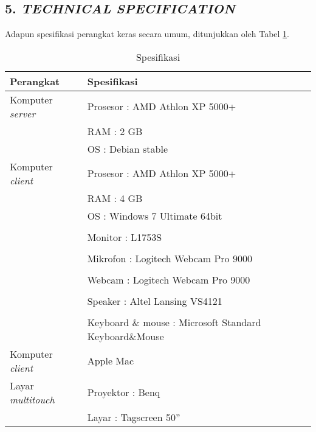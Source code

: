 \subsection*{\textcolor{subsectioncolor}{\textsf{5. \textit{TECHNICAL SPECIFICATION}}}}

Adapun spesifikasi perangkat keras secara umum, ditunjukkan oleh Tabel \ref{spesifikasi}.
\begin{table}
	\centering
		\begin{tabular}{|p{4cm}|p{11cm}|}
			\hline
				Perangkat & Spesifikasi\\
			\hline
				Komputer \textit{server} & Prosesor : AMD Athlon XP 5000+ \\
				& RAM : 2 GB\\
				& OS : Debian stable\\
			\hline
				Komputer \textit{client} & Prosesor : AMD Athlon XP 5000+\\
				& RAM : 4 GB\\
				& OS : Windows 7 Ultimate 64bit\\
				&\\
				& Monitor : L1753S\\
				&\\
				& Mikrofon : Logitech Webcam Pro 9000\\
				&\\
				& Webcam	: Logitech Webcam Pro 9000\\
				&\\
				& Speaker : Altel Lansing VS4121\\
				&\\
				& Keyboard \& mouse : Microsoft Standard Keyboard\&Mouse\\
			\hline
				Komputer \textit{client} & Apple Mac\\
			\hline
				Layar \textit{multitouch} & Proyektor : Benq\\
				& Layar : Tagscreen 50''\\
			\hline
		\end{tabular}
\caption{Spesifikasi}
\label{spesifikasi}
\end{table}
